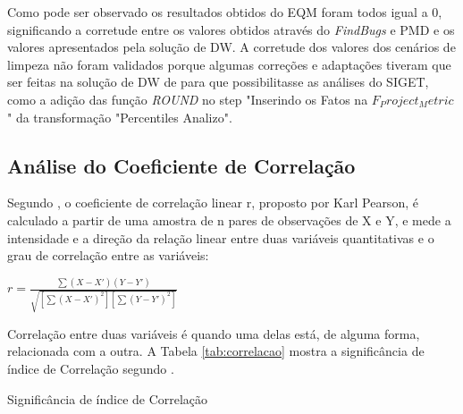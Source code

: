 \begin{table}[H]

\end{table}
\FloatBarrier

\begin{table}[H]

\end{table}
\FloatBarrier

\begin{table}[H]

\end{table}
\FloatBarrier

Como pode ser observado os resultados obtidos do EQM foram todos igual a 0, significando a corretude entre os valores obtidos através do \textit{FindBugs} e PMD e os valores apresentados pela solução de DW. A corretude dos valores dos cenários de limpeza não foram validados porque algumas correções e adaptações tiveram que ser feitas na solução de DW de \cite{rego_monitoramento_2014TCC} para que possibilitasse as análises do SIGET, como a adição das função \textit{ROUND} no step "Inserindo os Fatos na $F_Project_Metric $" da transformação "Percentiles Analizo".  


\subsection{Análise do Coeficiente de Correlação}

Segundo \cite{Wasserman2010}, o coeficiente de correlação linear r, proposto por Karl Pearson, é calculado a partir de uma amostra de n pares de observações de X e Y, e mede a intensidade e a direção da relação linear entre duas variáveis quantitativas e o grau de correlação entre as variáveis:

$ r = \frac{\sum(X-X')(Y-Y')}{\sqrt{[\sum(X-X')^{2}][\sum(Y-Y')^{2}]}} $


Correlação entre duas variáveis é quando uma delas está, de alguma forma, relacionada com a outra. A Tabela \ref{tab:correlacao} mostra a significância de índice de Correlação segundo \cite{Wasserman2010}.

\begin{table}[!ht]
	\begin{center}
 
	\caption{Significância de índice de Correlação}
	\label{tab:correlacao}
	\end{center}
	\end{table}	
	\FloatBarrier

